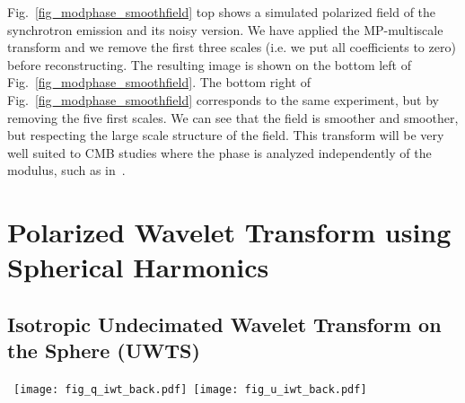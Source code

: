 Fig.~\ref{fig_modphase_smoothfield} top  shows a simulated polarized field of the synchrotron emission and its noisy version.
We have applied the MP-multiscale transform and we remove the first three scales (i.e. we put all coefficients to zero) before 
reconstructing. The resulting image is shown on the bottom left of Fig.~\ref{fig_modphase_smoothfield}. The bottom right of 
Fig.~\ref{fig_modphase_smoothfield} corresponds to the same experiment, but by removing the five first scales. We can see that 
the field is smoother and smoother, but respecting the large scale structure of the field. This transform will be very well suited 
to CMB studies where the phase is analyzed independently of the modulus, such as in~\cite{coles05,naselsky05}.



\section{Polarized Wavelet Transform using Spherical Harmonics}
\label{sec:pol_iwt}

\subsection{Isotropic Undecimated Wavelet Transform on the Sphere (UWTS) }
\label{sec:UWTS}

\begin{figure*}[htb]
\centerline{
 \hbox{
 \texttt{[image: fig\_q\_iwt\_back.pdf]}
 \texttt{[image: fig\_u\_iwt\_back.pdf]}
 }
 }
\caption{Q-isotropic wavelet transform backprojection (left) and U-isotropic wavelet backprojection (right).}
\label{fig_qu_iwt_back}
\end{figure*}


